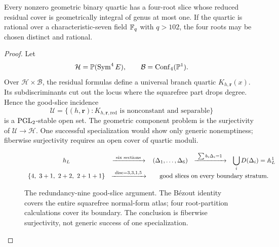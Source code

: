 \begin{proposition}
\label{prop:r9-components}%
%
Every nonzero geometric binary quartic has a four-root slice whose
reduced residual cover is geometrically integral of genus at most one.
If the quartic is rational over a characteristic-seven field
$\mathbb F_q$ with $q>102$, the four roots may be chosen distinct and
rational.
\end{proposition}

\begin{proof}
Let
\[
 \mathcal H=\mathbb P(\operatorname{Sym}^4E),\qquad
 \mathcal B=\operatorname{Conf}_4(\mathbb P^1).
\]
Over $\mathcal H\times\mathcal B$, the residual formulas define a
universal branch quartic $K_{h,\mathbf r}(x)$.  Its subdiscriminants
cut out the locus where the squarefree part drops degree.  Hence the
good-slice incidence
\[
 \mathcal U=\{(h,\mathbf r):K_{h,\mathbf r,\mathrm{red}}
 \text{ is nonconstant and separable}\}
\]
is a $\operatorname{PGL}_2$-stable open set.  The geometric component problem is the
surjectivity of $\mathcal U\to\mathcal H$.  One successful
specialization would show only generic nonemptiness; fiberwise
surjectivity requires an open cover of quartic moduli.

\begin{figure}[H]
\centering
\[
\begin{array}{ccccc}
h_L
&\xrightarrow{\ \text{six sections}\ }&
(\Delta_1,\ldots,\Delta_6)
&\xrightarrow{\ \sum b_i\Delta_i=1\ }&
\displaystyle\bigcup_iD(\Delta_i)=\mathbb A^1_L\\[6pt]
\{4,\ 3+1,\ 2+2,\ 2+1+1\}
&\xrightarrow{\ \operatorname{disc}=3,3,1,5\ }&
\multicolumn{3}{c}{\text{good slices on every boundary stratum}.}
\end{array}
\]
\caption{The redundancy-nine good-slice argument.  The B\'ezout
identity covers the entire squarefree normal-form atlas; four
root-partition calculations cover its boundary.  The conclusion is
fiberwise surjectivity, not generic success of one specialization.}
\label{fig:r9-slice-cover}
\end{figure}


\end{proof}
